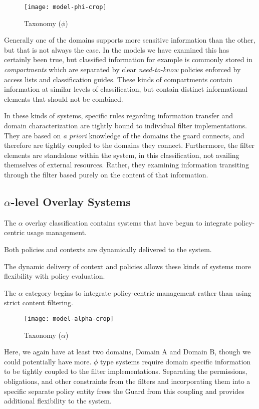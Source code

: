 \begin{figure}[!t]
\centering
\texttt{[image: model-phi-crop]}
\caption{Taxonomy ($\phi$)}
\label{fig:model:taxonomy-phi}
\end{figure}

Generally one of the domains supports more sensitive information than the other, but that is not always the case.  In the models we have examined this has certainly been true, but classified information for example  is commonly stored in \textit{compartments} which are separated by clear \textit{need-to-know} policies enforced by access lists and classification guides.  These kinds of compartments contain information at similar levels of classification, but contain distinct informational elements that should not be combined.

In these kinds of systems, specific rules regarding information transfer and domain characterization are tightly bound to individual filter implementations.  They are based on \textit{a priori} knowledge of the domains the guard connects, and therefore are tightly coupled to the domains they connect.  Furthermore, the filter elements are standalone within the system, in this classification, not availing themselves of external resources.  Rather, they examining information transiting through the filter based purely on the content of that information.

\subsection{$\alpha$-level Overlay Systems}
The $\alpha$ overlay classification contains systems that have begun to integrate policy-centric usage management.

Both policies and contexts are dynamically delivered to the system.

The dynamic delivery of context and policies allows these kinds of systems more flexibility with policy evaluation.

The $\alpha$ category begins to integrate policy-centric management rather than using strict content filtering.

\begin{figure}[!t]
\centering
\texttt{[image: model-alpha-crop]}
\caption{Taxonomy ($\alpha$)}
\label{fig:model:taxonomy-alpha}
\end{figure}

Here, we again have at least two domains, Domain A and Domain B, though we could potentially have more.  $\phi$ type systems require domain specific information to be tightly coupled to the filter implementations.  Separating the permissions, obligations, and other constraints from the filters and incorporating them into a specific separate policy entity frees the Guard from this coupling and provides additional flexibility to the system.

